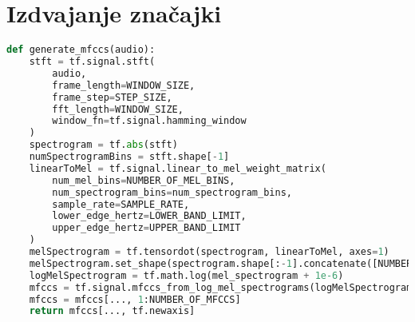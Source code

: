 \chapter{Izdvajanje značajki}
\label{add:mfcc}

\begin{lstlisting}[language=Python, caption=Izdvajanje značajki korišteno u Jupyter bilježnici]
def generate_mfccs(audio):
    stft = tf.signal.stft(
        audio,
        frame_length=WINDOW_SIZE,
        frame_step=STEP_SIZE,
        fft_length=WINDOW_SIZE,
        window_fn=tf.signal.hamming_window
    )
    spectrogram = tf.abs(stft)
    numSpectrogramBins = stft.shape[-1]
    linearToMel = tf.signal.linear_to_mel_weight_matrix(
        num_mel_bins=NUMBER_OF_MEL_BINS,
        num_spectrogram_bins=num_spectrogram_bins,
        sample_rate=SAMPLE_RATE,
        lower_edge_hertz=LOWER_BAND_LIMIT,
        upper_edge_hertz=UPPER_BAND_LIMIT
    )
    melSpectrogram = tf.tensordot(spectrogram, linearToMel, axes=1)
    melSpectrogram.set_shape(spectrogram.shape[:-1].concatenate([NUMBER_OF_MEL_BINS]))
    logMelSpectrogram = tf.math.log(mel_spectrogram + 1e-6)
    mfccs = tf.signal.mfccs_from_log_mel_spectrograms(logMelSpectrogram)
    mfccs = mfccs[..., 1:NUMBER_OF_MFCCS] 
    return mfccs[..., tf.newaxis]
\end{lstlisting}